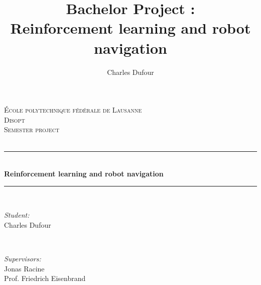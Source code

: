 \documentclass[14pt,a4paper]{article}
\author{Charles Dufour}
\title{Bachelor Project : \\
Reinforcement learning and robot navigation}
\theoremstyle{definition}
\begin{document}
\begin{titlepage}
\newcommand{\HRule}{\rule{\linewidth}{0.5mm}} %

\center %
 

\vspace{3cm}
\textsc{\LARGE \'Ecole polytechnique f\'ed\'erale de Lausanne}\\[0.5cm] %
\textsc{\large Disopt}\\[1.5cm] %
\textsc{\LARGE Semester project}\\[0.5cm] %
\textsc{\large }\\[0.5cm] %


\HRule \\[0.4cm]
{ \huge \bfseries Reinforcement learning and robot navigation}\\[0.4cm] %
\HRule \\[1.5cm]
 

\begin{minipage}{0.4\textwidth}
\begin{flushleft} \large
\emph{Student:}\\
Charles Dufour
\end{flushleft}
\end{minipage}
~
\begin{minipage}{0.4\textwidth}
\begin{flushright} \large
\emph{Supervisors:} \\
Jonas Racine\\%
Prof. Friedrich Eisenbrand 
\end{flushright}
\end{minipage}\\[5cm]


\end{titlepage}
\end{document}
